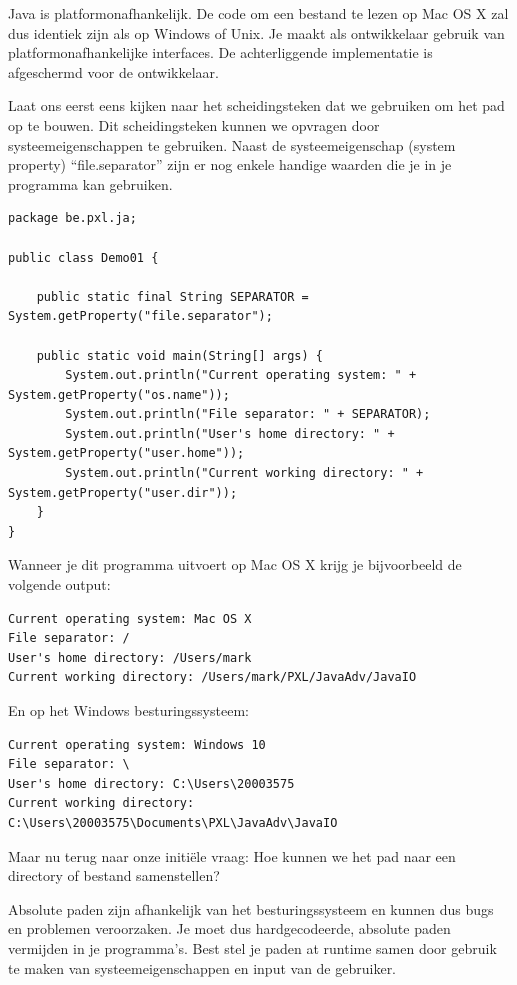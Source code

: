 \documentclass{tstextbook}
\begin{document}
Java is platformonafhankelijk. De code om een bestand te lezen op Mac OS X zal dus identiek zijn als op Windows of Unix. Je maakt als ontwikkelaar gebruik van platformonafhankelijke interfaces. De achterliggende implementatie is afgeschermd voor de ontwikkelaar.
 
Laat ons eerst eens kijken naar het scheidingsteken dat we gebruiken om het pad op te bouwen.
Dit scheidingsteken kunnen we opvragen door systeemeigenschappen te gebruiken.  Naast de systeemeigenschap (system property) ``file.separator'' zijn er nog enkele handige waarden die je in je programma kan gebruiken.

\begin{lstlisting}
package be.pxl.ja;

public class Demo01 {

	public static final String SEPARATOR = System.getProperty("file.separator");

	public static void main(String[] args) {
		System.out.println("Current operating system: " + System.getProperty("os.name"));
		System.out.println("File separator: " + SEPARATOR);
		System.out.println("User's home directory: " + System.getProperty("user.home"));
		System.out.println("Current working directory: " + System.getProperty("user.dir"));
	}
}
\end{lstlisting}

Wanneer je dit programma uitvoert op Mac OS X krijg je bijvoorbeeld de volgende output:
\begin{verbatim}
Current operating system: Mac OS X
File separator: /
User's home directory: /Users/mark
Current working directory: /Users/mark/PXL/JavaAdv/JavaIO
\end{verbatim}

En op het Windows besturingssysteem:
\begin{verbatim}
Current operating system: Windows 10
File separator: \
User's home directory: C:\Users\20003575
Current working directory: C:\Users\20003575\Documents\PXL\JavaAdv\JavaIO
\end{verbatim}

Maar nu terug naar onze initi\"ele vraag: Hoe kunnen we het pad naar een directory of bestand samenstellen?

Absolute paden zijn afhankelijk van het besturingssysteem en kunnen dus bugs en problemen veroorzaken. Je moet dus hardgecodeerde, absolute paden vermijden in je programma's. Best stel je paden at runtime samen door gebruik te maken van systeemeigenschappen en input van de gebruiker.
\end{document}
